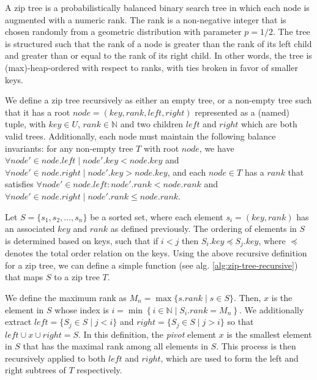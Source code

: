 \documentclass{article}
\begin{document}
A zip tree is a probabilistically balanced binary search tree in which each node is augmented with a numeric rank. The rank is a non-negative integer that is chosen randomly from a geometric distribution with parameter $p = 1/2$. The tree is structured such that the rank of a node is greater than the rank of its left child and greater than or equal to the rank of its right child. In other words, the tree is (max)-heap-ordered with respect to ranks, with ties broken in favor of smaller keys.

We define a zip tree recursively as either an empty tree, or a non-empty tree such that it has a root $node = \left(key, rank, left, right\right)$ represented as a (named) tuple, with $key \in U$, $rank \in \mathbb{N}$ and two children $left$ and $right$ which are both valid trees. Additionally, each node must maintain the following balance invariants: for any non-empty tree $T$ with root $node$, we have $\forall node' \in node.left \mid node'.key < node.key$ and $\forall node' \in node.right \mid node'.key > node.key$, and each $node \in T$ has a $rank$ that satisfies $\forall node' \in node.left : node'.rank < node.rank$ and $\forall node' \in node.right \mid node'.rank \le node.rank$.

Let $S = \{s_1, s_2, \ldots, s_n\}$ be a sorted set, where each element $s_i = \left(key, rank \right)$ has an associated $key$ and $rank$ as defined previously. The ordering of elements in $S$ is determined based on keys, such that if $i < j$ then $S_i.key \preceq S_j.key$, where $\preceq$ denotes the total order relation on the keys. Using the above recursive definition for a zip tree, we can define a simple function (see alg. \ref{alg:zip-tree-recursive}) that maps $S$ to a zip tree $T$.

We define the maximum rank as $M_n = \max\{s.rank \mid s \in S\}$. Then, $x$ is the element in $S$ whose index is $i = \min\left\{i \in \mathbb{N} \mid S_i.rank = M_n\right\}$. We additionally extract $left = \{S_j \in S \mid j < i\}$ and $right = \{S_j \in S \mid j > i\}$ so that $left \cup x \cup right = S$. In this definition, the \emph{pivot} element $x$ is the smallest element in $S$ that has the maximal rank among all elements in $S$. This process is then recursively applied to both $left$ and $right$, which are used to form the left and right subtrees of $T$ respectively.

\begin{algorithm}[ht]
    \caption{Recursive zip tree construction}\label{alg:zip-tree-recursive}
    \DontPrintSemicolon

\end{algorithm}
\end{document}
